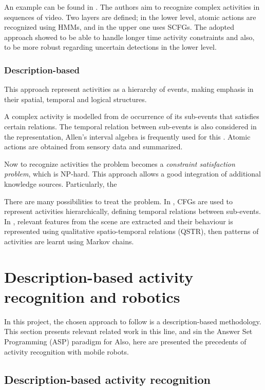 An example can be found in \citep{Ivanov2000_RecVisActSCFG}.
The authors aim to recognize complex activities in sequences of video.
Two layers are defined; in the lower level, atomic actions are recognized using HMMs, and in the upper one uses SCFGs.
The adopted approach showed to be able to handle longer time activity constraints and also, to be more robust regarding uncertain detections in the lower level.


\subsubsection{Description-based} \label{sec_description_ap}
This approach represent activities as a hierarchy of events, making emphasis in their spatial, temporal and logical structures.

A complex activity is modelled from de occurrence of its sub-events that satisfies certain relations.
The temporal relation between sub-events is also considered in the representation, Allen's interval algebra is frequently used for this \citep{Allen83_MaintainingKnowledgeTemporal}.
Atomic actions are obtained from sensory data and summarized. %

Now to recognize activities the problem becomes a \textit{constraint satisfaction problem}, which is NP-hard.
This approach allows a good integration of additional knowledge sources. 
Particularly, the 

There are many possibilities to treat the problem. In \citep{Nevatia2004_OntoVidEvRep,Ryoo2006_RecHuAcCFG}, CFGs are used to represent activities hierarchically, defining temporal relations between sub-events. 
In \citep{Sridhar10_UnsupervisedLearning}, relevant features from the scene are extracted and their behaviour is represented using qualitative spatio-temporal relations (QSTR), then patterns of activities are learnt using Markov chains.


\section{Description-based activity recognition and robotics}

In this project, the chosen approach to follow is a description-based methodology. 
This section presents relevant related work in this line, and sin the Answer Set Programming (ASP) paradigm for 
Also, here are presented the precedents of activity recognition with mobile robots.

\subsection{Description-based activity recognition}

